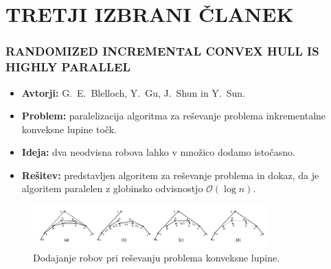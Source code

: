 \documentclass[a4paper, 12pt]{beamer}
\theoremstyle{definition}
\theoremstyle{plain}
\begin{document}
\section{TRETJI IZBRANI ČLANEK}
\begin{frame}
    \frametitle{\small{RANDOMIZED INCREMENTAL CONVEX HULL IS HIGHLY PARALLEL}}
    
    \begin{itemize}
        \item \textbf{Avtorji:} G.~E.~Blelloch, Y.~Gu, J.~Shun in Y.~Sun.
        \item \textbf{Problem:} paralelizacija algoritma za reševanje problema inkrementalne konveksne lupine točk.
        \item \textbf{Ideja:} dva neodvisna robova lahko v množico dodamo istočasno.
        \item \textbf{Rešitev:} predstavljen algoritem za reševanje problema in dokaz, da je algoritem paralelen z globinsko odvisnostjo $\mathcal{O}(\log n)$.
    \end{itemize}
    \begin{figure}[H]
        \centering
        \includegraphics[width=90mm]{convex_hull.jpg}
        \caption{Dodajanje robov pri reševanju problema konveksne lupine.}
    \end{figure}

\end{frame}
    
    



    
    


    
    


    
    





    
    
\end{document}
